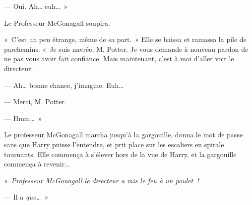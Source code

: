 --- Oui.
Ah… euh…~»

Le Professeur McGonagall soupira.

«~C'est un peu étrange, même de sa part.~»
Elle se baissa et ramassa la pile de parchemins.
«~Je suis navrée, M. Potter.
Je vous demande à nouveau pardon de ne pas vous avoir fait confiance.
Mais maintenant, c'est à moi d'aller voir le directeur.

--- Ah… bonne chance, j'imagine.
Euh…

--- Merci, M. Potter.

--- Hmm…~»

Le professeur McGonagall marcha jusqu'à la gargouille, donna le mot de passe sans que Harry puisse l'entendre, et prit place sur les escaliers en spirale tournants.
Elle commença à s'élever hors de la vue de Harry, et la gargouille commença à revenir…

«~\emph{Professeur McGonagall le directeur a mis le feu à un poulet~!}

--- Il a \emph{quo…}~»
